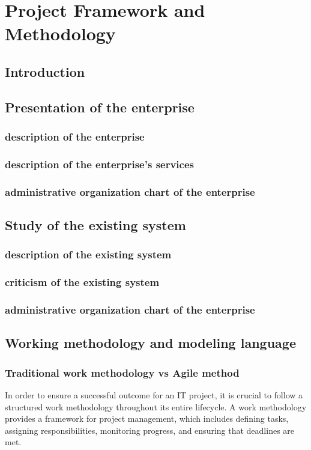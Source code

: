 %
%
\chapter{Project Framework and Methodology}
\section*{Introduction}
\section{Presentation of the  enterprise}
\subsection{description of the  enterprise }
\subsection{description of the  enterprise's services}
\subsection{administrative organization chart of the enterprise}
\vspace{1em}
\section{Study of the existing system}
\subsection{description of the existing system }
\subsection{criticism of the existing system}
\subsection{administrative organization chart of the enterprise}
\vspace{1em}
\section{Working methodology and modeling language}
\subsection{Traditional work methodology vs Agile method }
In order to ensure a successful outcome for an IT project, it is crucial to follow a structured work methodology throughout its entire lifecycle. A work methodology provides a framework for project management, which includes defining tasks, assigning responsibilities, monitoring progress, and ensuring that deadlines are met.\cite{PGC10}


